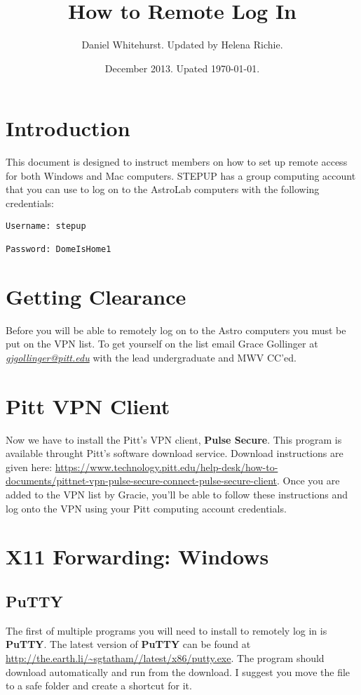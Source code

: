 \documentclass[11pt]{article}
\begin{document}
\title{How to Remote Log In}
\author{
Daniel Whitehurst. Updated by Helena Richie.}
\date{December 2013. Upated \today.}
\maketitle

\section{Introduction}
This document is designed to instruct members on how to set up remote access for both Windows and Mac computers. STEPUP has a group computing account that you can use to log on to the AstroLab computers with the following credentials:

\begin{verbatim}
Username: stepup

Password: DomeIsHome1
\end{verbatim}

\section{Getting Clearance}
Before you will be able to remotely log on to the Astro computers you must be put on the VPN list. To get yourself on the list email Grace Gollinger at \href{mailto:gjgollinger@pitt.edu}{\emph{gjgollinger@pitt.edu}} with the lead undergraduate and MWV CC'ed.


\section{Pitt VPN Client}
Now we have to install the Pitt's VPN client, \textbf{ Pulse Secure}. This program is available throught Pitt's software download service. Download instructions are given here: \url{https://www.technology.pitt.edu/help-desk/how-to-documents/pittnet-vpn-pulse-secure-connect-pulse-secure-client}. Once you are added to the VPN list by Gracie, you'll be able to follow these instructions and log onto the VPN using your Pitt computing account credentials.

\section{X11 Forwarding: Windows}
\subsection{PuTTY}
The first of multiple programs you will need to install to remotely log in is \textbf{PuTTY}. The latest version of \textbf{PuTTY} can be found at \url{http://the.earth.li/~sgtatham//latest/x86/putty.exe}. The program should download automatically and run from the download. I suggest you move the file to a safe folder and create a shortcut for it.
\end{document}
